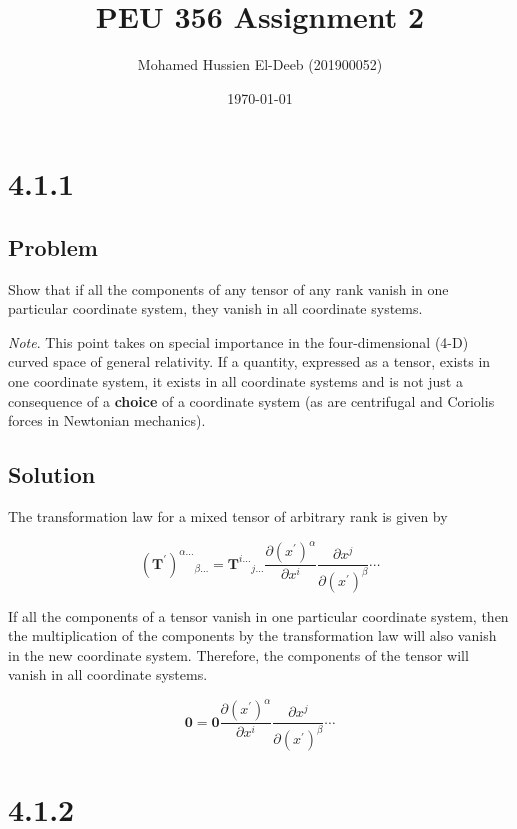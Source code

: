 \documentclass[12pt]{article}
\title{PEU 356 Assignment 2}
\author{Mohamed Hussien El-Deeb (201900052)}
\date{\today}
\begin{document}
\maketitle
\tableofcontents
\hypersetup{linkcolor=RoyalBlue4}

\newcommand*{\Perm}[2]{{}^{#1}\!P_{#2}}
\newcommand*{\Comb}[2]{{}^{#1} C_{#2}}

\newpage
\section{4.1.1}

\subsection{Problem}

Show that if all the components of any tensor of any rank vanish in one particular
coordinate system, they vanish in all coordinate systems.

\textit{Note}. This point takes on special importance in the four-dimensional (4-D) curved
space of general relativity. If a quantity, expressed as a tensor, exists in one coordinate
system, it exists in all coordinate systems and is not just a consequence of a \textbf{choice}
of a coordinate system (as are centrifugal and Coriolis forces in Newtonian mechanics).

\subsection{Solution}

The transformation law for a mixed tensor of arbitrary rank is given by

\[
    {\left(\textbf{T}^\prime\right)}^{\alpha \ldots}{ }_{\beta \ldots}
    = \textbf{T}^{i \ldots}{ }_{j \ldots}
    \frac{\partial {\left(x^\prime\right)}^\alpha}{\partial x^i}
    \frac{\partial x^j}{\partial {\left(x^\prime\right)}^\beta} \cdots
\]

If all the components of a tensor vanish in one particular coordinate system, then
the multiplication of the components by the transformation law will also vanish in
the new coordinate system. Therefore, the components of the tensor will vanish
in all coordinate systems.

\[
    \textbf{0} = \textbf{0}
    \frac{\partial {\left(x^\prime\right)}^\alpha}{\partial x^i}
    \frac{\partial x^j}{\partial {\left(x^\prime\right)}^\beta} \cdots
\]

\newpage
\section{4.1.2}
\end{document}
